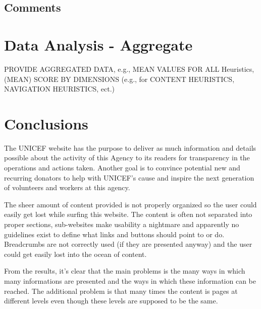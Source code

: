 \subsection{Comments}

\section{Data Analysis - Aggregate}
PROVIDE AGGREGATED DATA, e.g., MEAN VALUES FOR ALL Heuristics,
(MEAN) SCORE BY DIMENSIONS (e.g., for CONTENT HEURISTICS,
NAVIGATION HEURISTICS, ect.)

\section{Conclusions}
The UNICEF website has the purpose to deliver as much information and details possible about the activity of this Agency to its readers for transparency in the operations and actions taken. Another goal is to convince potential new and recurring donators to help with UNICEF's cause and inspire the next generation of volunteers and workers at this agency.

The sheer amount of content provided is not properly organized so the user could easily get lost while surfing this website. The content is often not separated into proper sections, sub-websites make usability a nightmare and apparently no guidelines exist to define what links and buttons should point to or do. Breadcrumbs are not correctly used (if they are presented anyway) and the user could get easily lost into the ocean of content.

From the results, it's clear that the main problems is the many ways in which many informations are presented and the ways in which these information can be reached. The additional problem is that many times the content is pages at different levels even though these levels are supposed to be the same.


